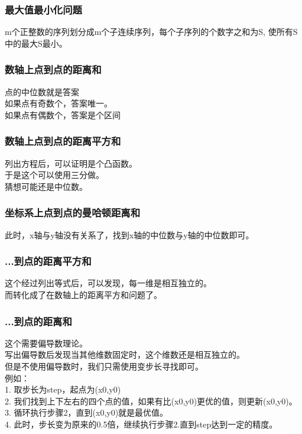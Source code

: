 \documentclass[a4paper]{article}
\begin{document}
\begin{CJK*}{UTF8}{gbsn}
\begin{multicols}{3}
\begin{flushleft}
\subsubsection{最大值最小化问题}
m个正整数的序列划分成m个子连续序列，每个子序列的个数字之和为S, 使所有S中的最大S最小。\\

\subsubsection{数轴上点到点的距离和}
点的中位数就是答案\\
如果点有奇数个，答案唯一。\\
如果点有偶数个，答案是个区间\\

\subsubsection{数轴上点到点的距离平方和}
列出方程后，可以证明是个凸函数。\\
于是这个可以使用三分做。\\
猜想可能还是中位数。\\

\subsubsection{坐标系上点到点的曼哈顿距离和}
此时，x轴与y轴没有关系了，找到x轴的中位数与y轴的中位数即可。\\

\subsubsection{...到点的距离平方和}
这个经过列出等式后，可以发现，每一维是相互独立的。\\
而转化成了在数轴上的距离平方和问题了。\\

\subsubsection{...到点的距离和}
这个需要偏导数理论。\\
写出偏导数后发现当其他维数固定时，这个维数还是相互独立的。\\
但是不使用偏导数时，我们只需使用变步长寻找即可。\\
例如：\\
1. 取步长为step，起点为(x0,y0)\\
2. 我们找到上下左右的四个点的值，如果有比(x0,y0)更优的值，则更新(x0,y0)。\\
3. 循环执行步骤2，直到(x0,y0)就是最优值。\\
4. 此时，步长变为原来的0.5倍，继续执行步骤2.直到step达到一定的精度。\\


\end{flushleft}
\end{multicols}
\end{CJK*}
\end{document}
